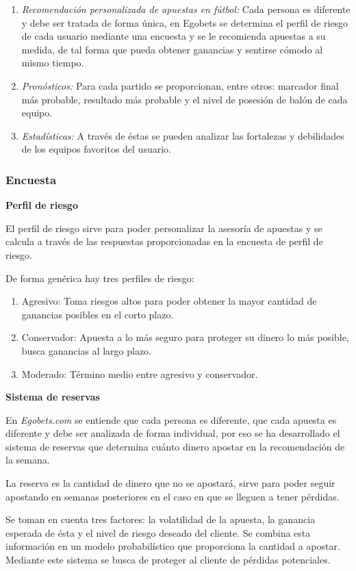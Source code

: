 \begin{enumerate}
	\item \emph{Recomendación personalizada de apuestas en fútbol:} Cada persona es diferente y debe ser tratada de forma única, en Egobets se determina el perfil de riesgo de cada usuario mediante una encuesta y se le recomienda apuestas a su medida, de tal forma que pueda obtener ganancias y sentirse cómodo al mismo tiempo.
	\item \emph{Pronósticos:} Para cada partido se proporcionan, entre otros: marcador final más probable, resultado más probable y el nivel de posesión de balón de cada equipo.
	\item \emph{Estadísticas:} A través de éstas se pueden analizar las fortalezas y debilidades de los equipos favoritos del usuario.
\end{enumerate}

\subsubsection{Encuesta}

\textbf{Perfil de riesgo}


El perfil de riesgo sirve para poder personalizar la asesoría de apuestas y se calcula a través de las respuestas proporcionadas en la encuesta de perfil de riesgo.

De forma genérica hay tres perfiles de riesgo:
\begin{enumerate}
	\item Agresivo: Toma riesgos altos para poder obtener la mayor cantidad de ganancias posibles en el corto plazo. 
	\item Conservador: Apuesta a lo más seguro para proteger su dinero lo más posible, busca ganancias al largo plazo.
	\item Moderado: Término medio entre agresivo y conservador.
\end{enumerate}

\textbf{Sistema de reservas}

En \emph{Egobets.com} se entiende que cada persona es diferente, que cada apuesta es diferente y debe ser analizada de forma individual, por eso se ha desarrollado el sistema de reservas que determina cuánto dinero apostar en la recomendación de la semana.

La reserva es la cantidad de dinero que no se apostará, sirve para poder seguir apostando en semanas posteriores en el caso en que se lleguen a tener pérdidas.


Se toman en cuenta tres factores: la volatilidad de la apuesta, la ganancia esperada de ésta y el nivel de riesgo deseado del cliente. Se combina esta información en un modelo probabilístico que proporciona la cantidad a apostar. Mediante este sistema se busca de proteger al cliente de pérdidas potenciales.

